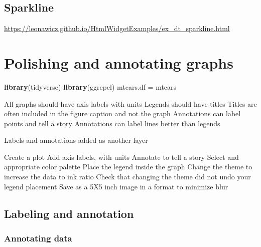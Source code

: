 \documentclass[]{krantz}
\makeatletter
\newenvironment{Shaded}{\begin{snugshade}}{\end{snugshade}}
\newcommand{\KeywordTok}[1]{\textcolor[rgb]{0.13,0.29,0.53}{\textbf{#1}}}
\newcommand{\StringTok}[1]{\textcolor[rgb]{0.31,0.60,0.02}{#1}}
\newcommand{\NormalTok}[1]{#1}
\newenvironment{kframe}{%
\medskip{}
\setlength{\fboxsep}{.8em}
 \def\at@end@of@kframe{}%
 \ifinner\ifhmode%
  \def\at@end@of@kframe{\end{minipage}}%
  \begin{minipage}{\columnwidth}%
 \fi\fi%
 \def\FrameCommand##1{\hskip\@totalleftmargin \hskip-\fboxsep
 \colorbox{shadecolor}{##1}\hskip-\fboxsep
     \hskip-\linewidth \hskip-\@totalleftmargin \hskip\columnwidth}%
 \MakeFramed {\advance\hsize-\width
   \@totalleftmargin\z@ \linewidth\hsize
   \@setminipage}}%
 {\par\unskip\endMakeFramed%
 \at@end@of@kframe}
\renewenvironment{Shaded}{\begin{kframe}}{\end{kframe}}
\theoremstyle{definition}
\theoremstyle{definition}
\theoremstyle{definition}
\theoremstyle{remark}
\makeatother
\begin{document}
\hypertarget{htmlwidget-9c959344eeaf9ae86f4e}{}

\section{Sparkline}\label{sparkline}

\url{https://leonawicz.github.io/HtmlWidgetExamples/ex_dt_sparkline.html}

\cleardoublepage 

\chapter{Polishing and annotating graphs}\label{Polishing}

\begin{Shaded}
\begin{Highlighting}[]
\KeywordTok{library}\NormalTok{(tidyverse)}
\KeywordTok{library}\NormalTok{(ggrepel)}
\NormalTok{mtcars.df =}\StringTok{ }\NormalTok{mtcars}
\end{Highlighting}
\end{Shaded}

All graphs should have axis labels with units Legends should have titles
Titles are often included in the figure caption and not the graph
Annotations can label points and tell a story Annotations can label
lines better than legends

Labels and annotations added as another layer

Create a plot Add axis labels, with units Annotate to tell a story
Select and appropriate color palette Place the legend inside the graph
Change the theme to increase the data to ink ratio Check that changing
the theme did not undo your legend placement Save as a 5X5 inch image in
a format to minimize blur

\section{Labeling and annotation}\label{labeling-and-annotation}

\subsection{Annotating data}\label{annotating-data}
\end{document}
